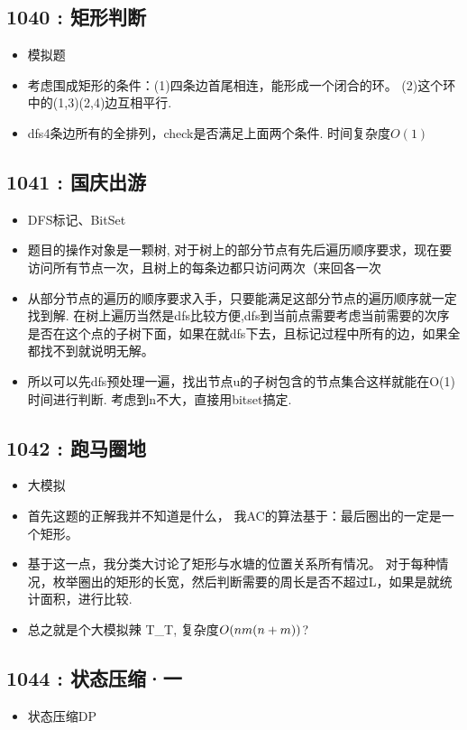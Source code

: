 \documentclass{article}
\begin{document}
\subsection{1040 : 矩形判断}
\begin{itemize}
\item 模拟题
\item 考虑围成矩形的条件：(1)四条边首尾相连，能形成一个闭合的环。 (2)这个环中的(1,3)(2,4)边互相平行.
\item dfs4条边所有的全排列，check是否满足上面两个条件. 时间复杂度$O(1)$
\end{itemize}


\subsection{1041 : 国庆出游}
\begin{itemize}
\item DFS标记、BitSet
\item 题目的操作对象是一颗树, 对于树上的部分节点有先后遍历顺序要求，现在要访问所有节点一次，且树上的每条边都只访问两次（来回各一次
\item 从部分节点的遍历的顺序要求入手，只要能满足这部分节点的遍历顺序就一定找到解. 在树上遍历当然是dfs比较方便,dfs到当前点需要考虑当前需要的次序是否在这个点的子树下面，如果在就dfs下去，且标记过程中所有的边，如果全都找不到就说明无解。
\item 所以可以先dfs预处理一遍，找出节点u的子树包含的节点集合这样就能在O(1)时间进行判断. 考虑到n不大，直接用bitset搞定.
\end{itemize}


\subsection{1042 : 跑马圈地}
\begin{itemize}
\item 大模拟
\item 首先这题的正解我并不知道是什么， 我AC的算法基于：最后圈出的一定是一个矩形。
\item 基于这一点，我分类大讨论了矩形与水塘的位置关系所有情况。 对于每种情况，枚举圈出的矩形的长宽，然后判断需要的周长是否不超过L，如果是就统计面积，进行比较.
\item 总之就是个大模拟辣 T\_T, 复杂度$O(n\*m\*(n+m))$?
\end{itemize}


\subsection{1044 : 状态压缩·一}
\begin{itemize}
\item 状态压缩DP
\end{itemize}

\end{document}
